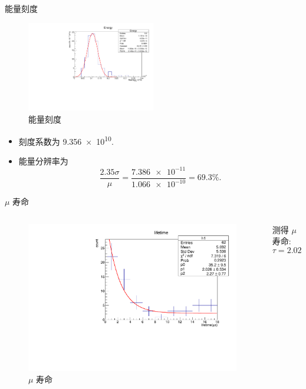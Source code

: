\documentclass[10pt]{beamer}
\begin{document}
\begin{frame}[label={sec:orgb644da9}]{能量刻度}
\begin{figure}[htbp]
\centering
\includegraphics[width=0.5\textwidth]{../../DetectorPerform/ECali/qqdist.pdf}
\caption{能量刻度}
\end{figure}

\begin{itemize}
\item 刻度系数为 \num{9.356e10}.
\item 能量分辨率为
\begin{equation}
\label{eq:4}
\frac{2.35\sigma}{\mu} = \frac{\num{7.386e-11}}{\num{1.066e-10}} = 69.3\%.
\end{equation}
\end{itemize}
\end{frame}

\begin{frame}[label={sec:org7209cb1}]{\(\mu\) 寿命}
\begin{columns}
\begin{column}{0.5\columnwidth}
\begin{figure}[htbp]
\centering
\includegraphics[width=1.0\textwidth]{../../img/lifeTimeHist.pdf}
\caption{\(\mu\) 寿命}
\end{figure}
\end{column}

\begin{column}{0.5\columnwidth}
测得 \(\mu\) 寿命:  
\begin{equation}
\label{eq:5}
\tau = 2.026 \pm \qty{0.534}{\mu s}.
\end{equation}
\end{column}
\end{columns}
\end{frame}
\end{document}
